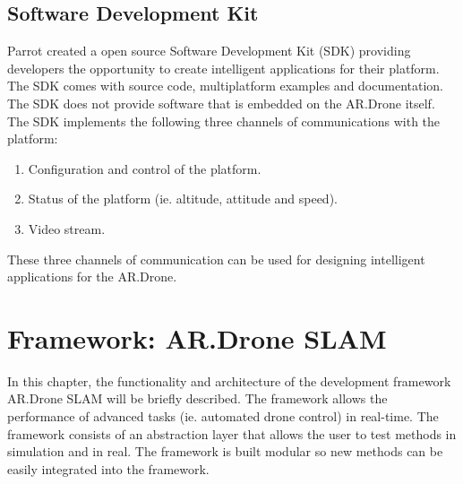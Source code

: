 \documentclass[a4paper]{article}
\begin{document}
\begin{appendices}
\subsection{Software Development Kit}
Parrot created a open source Software Development Kit (SDK) providing developers the opportunity to create intelligent applications for their platform. The SDK comes with source code, multiplatform examples and documentation. The SDK does not provide software that is embedded on the AR.Drone itself. The SDK implements the following three channels of communications with the platform:
\begin{enumerate}
\item Configuration and control of the platform.
\item Status of the platform (ie. altitude, attitude and speed).
\item Video stream.
\end{enumerate}
These three channels of communication can be used for designing intelligent applications for the AR.Drone.

\newpage
\section{Framework: AR.Drone SLAM}
\label{FRAMEWORK}
In this chapter, the functionality and architecture of the development framework AR.Drone SLAM \cite{Dijkshoorn2012} will be briefly described. The framework allows the performance of advanced tasks (ie. automated drone control) in real-time. The framework consists of an abstraction layer that allows the user to test methods in simulation and in real. The framework is built modular so new methods can be  easily integrated into the framework.

\end{appendices}
\end{document}
